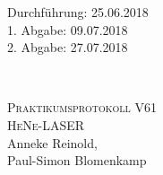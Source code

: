 



\begin{titlepage}
  \begin{flushleft}
 Durchführung: 25.06.2018\\
 1. Abgabe: 09.07.2018\\
 2. Abgabe: 27.07.2018
  \end{flushleft}


\HRule\\[1,0cm]

 \begin{center}


\textsc{\LARGE Praktikumsprotokoll V61}\\[1.5cm]
\textsc{\huge HeNe-LASER} \\[5,5cm]

Anneke Reinold\footnotemark[1], \\
Paul-Simon Blomenkamp\footnotemark[2] \\[1,0cm]



 \end{center}
\HRule

 \vfill

\end{titlepage}






\printbibliography


